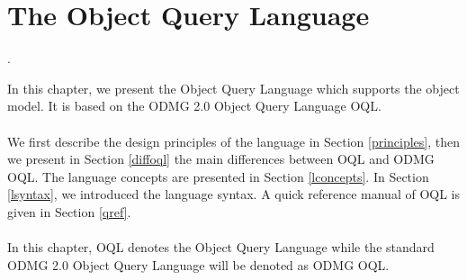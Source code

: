 

\newcommand{\mantitle}{\textsc{Object Query Language}}


\tableofcontents

\chapter*{The Object Query Language}
\newcommand{\ex}{\emph{expr} }
\newcommand{\oqlsect}[1]{Section \ref{#1}}
\newcommand{\bin}[1]{\ex\texttt{#1} \ex}
\newcommand{\ass}[1]{\emph{lvalue} \texttt{#1} \ex}
\newcommand{\una}[1]{\texttt{#1} \ex}
\newcommand{\unar}[1]{\ex \texttt{#1}}
\newcommand{\ide}{\emph{identifier} }
\newcommand{\unide}[1]{\texttt{#1} \emph{identifier}}

\newcommand{\xtab}{longtable}
\newcommand{\btab}{\\\begin{longtable}}
\newcommand{\etab}{\end{longtable}}
\newcommand{\dimtab}{|p{3cm}|p{4cm}|}
\newcommand{\dimtabx}{|p{3cm}|p{5cm}|}

\newcommand{\rerr}{\emph{raises an error}}
\newcommand{\Cidem}{expression syntax, semantics, associativity
and precedence are quite identical to the corresponding C and C++ expressions}.
\newcommand{\geninfo}{\hline \multicolumn{2}{|c|}{\emph{General Information}}}
\newcommand{\expex}[1]{\hline \multicolumn{#1}{|c|}{\emph{Expression Examples}}}
\newcommand{\poscomb}[1]{\hline \multicolumn{#1}{|c|}{\emph{Possible Operand Combinations}}}
\newcommand{\bettabx}{\mbox{ }\\\\\mbox{ }\\}
\newcommand{\bettab}{\mbox{}}

In this chapter, we present the \eyedb Object Query Language which supports
the \eyedb object model. It is based on the ODMG 2.0 Object Query Language
OQL.
\\
\\
We first describe the design principles of the language in
\oqlsect{principles}, then
we present in \oqlsect{diffoql} the main differences between \eyedb
OQL and ODMG OQL.
The language concepts are presented in \oqlsect{lconcepts}.
In \oqlsect{lsyntax}, we introduced the language syntax.
A quick reference manual of OQL is given in \oqlsect{qref}.
\\
\\
In this chapter, OQL denotes the \eyedb Object Query Language while
the standard ODMG 2.0 Object Query Language will be denoted as ODMG OQL.

